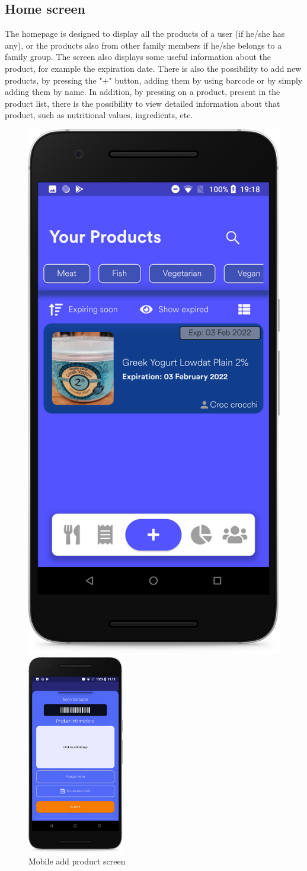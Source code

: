 \subsection{Home screen}
The homepage is designed to display all the products of a user (if he/she has any), or the products also from other family members if he/she belongs to a family group.
The screen also displays some useful information about the product, for example the expiration date.
There is also the possibility to add new products, by pressing the "+" button, adding them by using barcode or by simply adding them by name.
In addition, by pressing on a product, present in the product list, there is the possibility to view detailed information about that product, such as nutritional values, ingredients, etc.
\newpage

\vspace*{-0.3cm}
\begin{figure}[H]
  \begin{minipage}{0.5\textwidth}
  \centering
    \includegraphics[width=42.mm,scale=0.9]{./Images//Mobile_mocks/home1.png}
    \vspace*{-0.3cm}
    \caption{Mobile product list screen}
    \end{minipage}
\hfill
   \begin{minipage}{0.5\textwidth}
     \centering
     \includegraphics[width=42mm,scale=0.9]{./Images//Mobile_mocks/home2.png}
     \vspace*{-0.3cm}
     \caption{Mobile add product screen}
   \end{minipage}
\end{figure}

